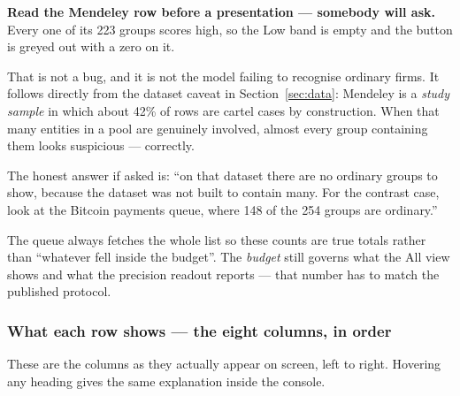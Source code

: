 \documentclass[11pt,a4paper]{article}
\begin{document}
\begin{warnbox}
\textbf{Read the Mendeley row before a presentation --- somebody will ask.}
Every one of its 223 groups scores high, so the Low band is empty and the button
is greyed out with a zero on it.

That is not a bug, and it is not the model failing to recognise ordinary firms.
It follows directly from the dataset caveat in Section~\ref{sec:data}: Mendeley
is a \emph{study sample} in which about 42\% of rows are cartel cases by
construction. When that many entities in a pool are genuinely involved, almost
every group containing them looks suspicious --- correctly.

The honest answer if asked is: ``on that dataset there are no ordinary groups to
show, because the dataset was not built to contain many. For the contrast case,
look at the Bitcoin payments queue, where 148 of the 254 groups are ordinary.''
\end{warnbox}

The queue always fetches the whole list so these counts are true totals rather
than ``whatever fell inside the budget''. The \emph{budget} still governs what
the All view shows and what the precision readout reports --- that number has to
match the published protocol.

\subsubsection*{What each row shows --- the eight columns, in order}

These are the columns as they actually appear on screen, left to right. Hovering
any heading gives the same explanation inside the console.
\end{document}
